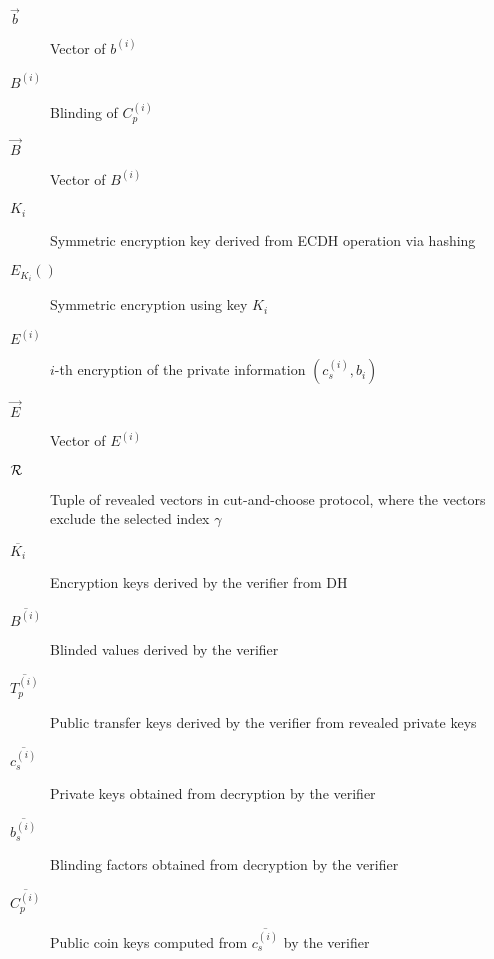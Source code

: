 \documentclass{llncs}
\begin{document}
\begin{description}
  \item[$\vec{b}$]{Vector of $b^{(i)}$}
  \item[$B^{(i)}$]{Blinding of $C_p^{(i)}$}
  \item[$\vec{B}$]{Vector of $B^{(i)}$}
  \item[$K_i$]{Symmetric encryption key derived from ECDH operation via hashing}
  \item[$E_{K_i}()$]{Symmetric encryption using key $K_i$}
  \item[$E^{(i)}$]{$i$-th encryption of the private information $(c_s^{(i)}, b_i)$}
  \item[$\vec{E}$]{Vector of $E^{(i)}$}
  \item[$\cal{R}$]{Tuple of revealed vectors in cut-and-choose protocol,
    where the vectors exclude the selected index $\gamma$}
  \item[$\overline{K_i}$]{Encryption keys derived by the verifier from DH}
  \item[$\overline{B^{(i)}}$]{Blinded values derived by the verifier}
  \item[$\overline{T_p^{(i)}}$]{Public transfer keys derived by the verifier from revealed private keys}
  \item[$\overline{c_s^{(i)}}$]{Private keys obtained from decryption by the verifier}
  \item[$\overline{b_s^{(i)}}$]{Blinding factors obtained from decryption by the verifier}
  \item[$\overline{C^{(i)}_p}$]{Public coin keys computed from $\overline{c_s^{(i)}}$ by the verifier}
\end{description}
\end{document}
